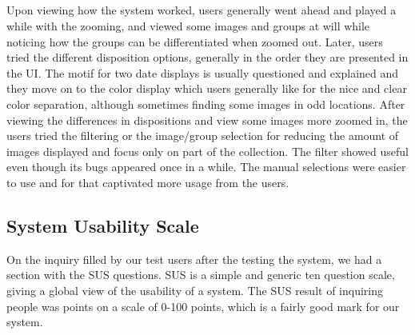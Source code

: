 \subsection{}

Upon viewing how the system worked, users generally went ahead and played a while with the zooming, and viewed some images and groups at will while noticing how the groups can be differentiated when zoomed out. Later, users tried the different disposition options, generally in the order they are presented in the \ac{UI}. The motif for two date displays is usually questioned and explained and they move on to the color display which users generally like for the nice and clear color separation, although sometimes finding some images in odd locations. After viewing the differences in dispositions and view some images more zoomed in, the users tried the filtering or the image/group selection for reducing the amount of images displayed and focus only on part of the collection. The filter showed useful even though its bugs appeared once in a while. The manual selections were easier to use and for that captivated more usage from the users.


\subsection{System Usability Scale}

On the inquiry filled by our test users after the testing the system, we had a section with the \acf{SUS} questions. \ac{SUS}\cite{Brooke:1996ua} is a simple and generic ten question scale, giving a global view of the usability of a system. The \ac{SUS} result of inquiring  people was  points on a scale of 0-100 points, which is a fairly good mark for our system.

